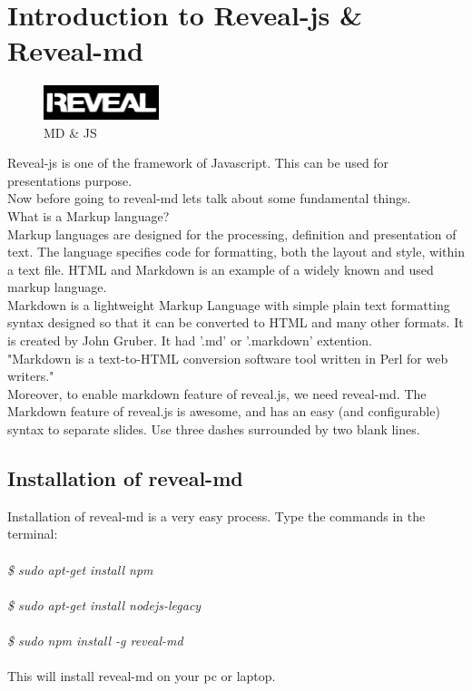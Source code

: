 \section{Introduction to Reveal-js \& Reveal-md}
\begin{figure}[!ht]
	\centering
	\includegraphics[width=0.3\textwidth]{input/images/rd.jpg}                   
	\caption{MD \& JS}
	\hspace{-1.5em}
\end{figure}
Reveal-js is one of the framework of Javascript. This can be used for presentations purpose.\\
Now before going to reveal-md lets talk about some fundamental things.\\
What is a Markup language?\\
Markup languages are designed for the processing, definition and presentation of text. The language specifies code for formatting, both the layout and style, within a text file. HTML and Markdown  is an example of a widely known and used markup language.\\
Markdown is a lightweight Markup Language with simple plain text formatting syntax designed so that it can be converted to HTML and many other formats. It is created by  John Gruber. It had '.md' or '.markdown' extention.\\
"Markdown is a text-to-HTML conversion software tool written in Perl for web writers."\\
Moreover, to enable markdown feature of reveal.js, we need reveal-md. The Markdown feature of reveal.js is awesome, and has an easy (and configurable) syntax to separate slides. Use three dashes surrounded by two blank lines.\\
\subsection{Installation of reveal-md}
Installation of reveal-md is a very easy process.
Type the commands in the terminal:\\\\
\emph{
	\$ sudo apt-get install npm\\\\
	\$ sudo apt-get install nodejs-legacy\\\\
	\$ sudo npm install -g reveal-md\\\\}
This will install reveal-md on your pc or laptop.



